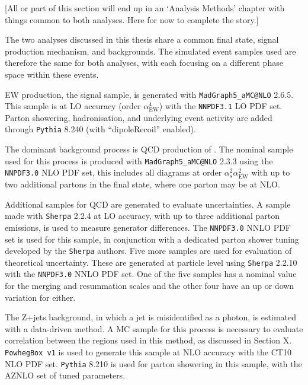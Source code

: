 
[All or part of this section will end up in an `Analysis Methods' chapter with
things common to both analyses. Here for now to complete the story.]

The two analyses discussed in this thesis share a common final state, signal
production mechanism, and backgrounds. The simulated event samples used are
therefore the same for both analyses, with each focusing on a different phase
space within these events.

\ac{EW} \Zyjj production, the signal sample, is generated with
\verb|MadGraph5_aMC@NLO| 2.6.5. %
This sample is at \ac{LO} accuracy (order $\alpha_\text{EW}^4$) with the
\verb|NNPDF3.1| \ac{LO} \ac{PDF} set. %
Parton showering, hadronisation, and underlying event activity are added through
\verb|Pythia| 8.240 %
(with ``dipoleRecoil'' enabled).

The dominant background process is \ac{QCD} production of \Zyjj. The nominal
sample used for this process is produced with
\verb|MadGraph5_aMC@NLO| 2.3.3 %
using the
\verb|NNPDF3.0| \ac{NLO} \ac{PDF} set, %
this includes all diagrams at order $\alpha_s^2\alpha_\text{EW}^2$ with up to
two additional partons in the final state, where one parton may be at \ac{NLO}.

Additional samples for \ac{QCD} \Zyjj are generated to evaluate uncertainties.
A sample made with
\verb|Sherpa| 2.2.4 %
at \ac{LO} accuracy, with up to three additional parton emissions, is used to
measure generator differences.
The \verb|NNPDF3.0| \ac{NNLO} \ac{PDF} set %
is used for this sample, in
conjunction with a dedicated parton shower tuning developed by the \verb|Sherpa|
authors.
%
Five more samples are used for evaluation of theoretical uncertainty. These are
generated at particle level using
\verb|Sherpa| 2.2.10 %
with the \verb|NNPDF3.0| \ac{NNLO} \ac{PDF} set. %
One of the five samples has a nominal value for the merging and resummation
scales and the other four have an up or down variation for either.


The Z+jets background, in which a jet is misidentified as a photon, is estimated
with a data-driven method. A \ac{MC} sample for this process is necessary to
evaluate correlation between the regions used in this method, as discussed in
Section X. %
\verb|PowhegBox v1| %
is used to generate this sample at \ac{NLO} accuracy with the CT10 \ac{NLO}
\ac{PDF} set. %
\verb|Pythia| 8.210 %
is used for parton showering in this sample, with the AZNLO %
set of tuned parameters.

